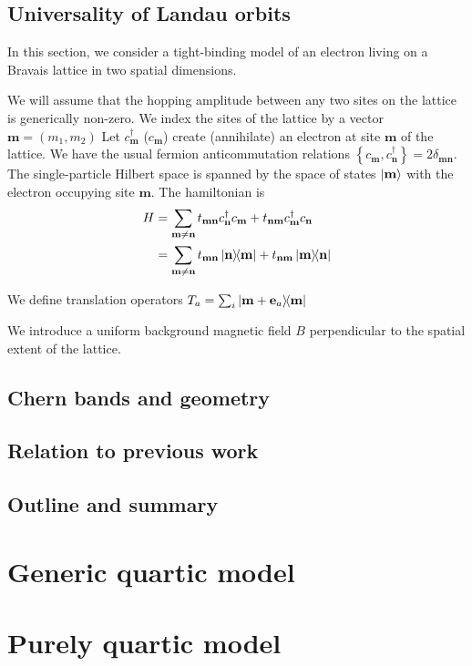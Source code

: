\documentclass[aps,prb,twocolumn,letterpaper,twoside,nobalancelastpage,groupedaddress,amsmath,amssymb,floatfix,citeautoscript]{revtex4-1}
\begin{document}
\subsection{Universality of Landau orbits}
In this section, we consider a tight-binding model of an electron living on a Bravais lattice in two spatial dimensions. 

We will assume that the hopping amplitude between any two sites on the lattice is generically non-zero. We index the sites of the lattice by a vector $\mathbf{m} = (m_1, m_2)$ Let $c^{\dag}_{\mathbf{m}}$ ($c_{\mathbf{m}}$) create (annihilate) an electron at site $\mathbf{m}$ of the lattice. We have the usual fermion anticommutation relations $\left\{c_{\mathbf{m}},c_{\mathbf{n}}^{\dag}\right\} = 2\delta_{\mathbf{m} \mathbf{n}}$. The single-particle Hilbert space is spanned by the space of states $\ket{\mathbf{m}}$ with the electron occupying site $\mathbf{m}$. The hamiltonian is
\begin{align*}
H &= \sum_{\mathbf{m}\neq \mathbf{n}} t_{\mathbf{m}\mathbf{n}} c^{\dag}_\mathbf{n} c_\mathbf{m}  + t_{\mathbf{n}\mathbf{m}} c^{\dag}_{\mathbf{m}} c_{\mathbf{n}}\\  &= \sum_{\mathbf{m}\neq \mathbf{n}} t_{\mathbf{m}\mathbf{n}} \dyad{\mathbf{n}}{\mathbf{m}} + t_{\mathbf{n}\mathbf{m}} \dyad{\mathbf{m}}{\mathbf{n}}
\end{align*}

We define translation operators $T_a = \sum_i \dyad{\mathbf{m} + \mathbf{e}_a}{\mathbf{m}}$




We introduce a uniform background magnetic field $B$ perpendicular to the spatial extent of the lattice. 







\subsection{Chern bands and geometry}



\subsection{Relation to previous work}

\subsection{Outline and summary}



\section{Generic quartic model}

\section{Purely quartic model}

\section{}

 \begin{acknowledgments}

 \end{acknowledgments}


% 
\end{document}
